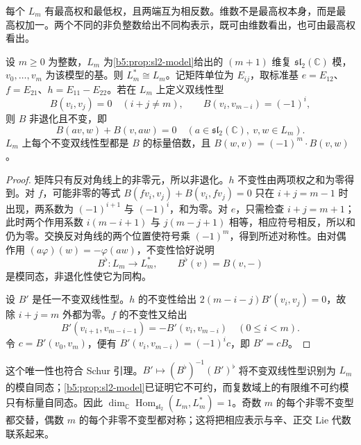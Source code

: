 每个 \(L_m\) 有最高权和最低权，且两端互为相反数。维数不是最高权本身，而是最高权加一。两个不同的非负整数给出不同构表示，既可由维数看出，也可由最高权看出。
\begin{proposition}\label{b5:prop:sl2-dual}
	设 \(m\ge0\) 为整数，\(L_m\) 为\cref{b5:prop:sl2-model}给出的 \((m+1)\) 维复 \(\mathfrak{sl}_2(\mathbb C)\) 模，\(v_0,\ldots,v_m\) 为该模型的基。则 \(L_m^*\cong L_m\)。记矩阵单位为 \(E_{ij}\)，取标准基 \(e=E_{12}\)、\(f=E_{21}\)、\(h=E_{11}-E_{22}\)。若在 \(L_m\) 上定义双线性型
	\[
		B(v_i,v_j)=0\quad(i+j\ne m),\qquad B(v_i,v_{m-i})=(-1)^i,
	\]
	则 \(B\) 非退化且不变，即
	\[
		B(av,w)+B(v,aw)=0 \quad(a\in\mathfrak{sl}_2(\mathbb C),\ v,w\in L_m).
	\]
	\(L_m\) 上每个不变双线性型都是 \(B\) 的标量倍数，且 \(B(w,v)=(-1)^m\cdot B(v,w)\)。
\end{proposition}
\begin{proof}
	矩阵只有反对角线上的非零元，所以非退化。\(h\) 不变性由两项权之和为零得到。对 \(f\)，可能非零的等式 \(B(fv_i,v_j)+B(v_i,fv_j)=0\) 只在 \(i+j=m-1\) 时出现，两系数为 \((-1)^{i+1}\) 与 \((-1)^i\)，和为零。对 \(e\)，只需检查 \(i+j=m+1\)；此时两个作用系数 \(i(m-i+1)\) 与 \(j(m-j+1)\) 相等，相应符号相反，所以和仍为零。交换反对角线的两个位置使符号乘 \((-1)^m\)，得到所述对称性。由对偶作用 \((a\varphi)(w)=-\varphi(aw)\)，不变性恰好说明
	\[
		B^\flat:L_m\longrightarrow L_m^*,\qquad B^\flat(v)=B(v,-)
	\]
	是模同态，非退化性使它为同构。

	设 \(B'\) 是任一不变双线性型。\(h\) 的不变性给出 \(2(m-i-j)B'(v_i,v_j)=0\)，故除 \(i+j=m\) 外都为零。\(f\) 的不变性又给出
	\[
		B'(v_{i+1},v_{m-i-1})=-B'(v_i,v_{m-i}) \quad(0\le i<m).
	\]
	令 \(c=B'(v_0,v_m)\)，便有 \(B'(v_i,v_{m-i})=(-1)^ic\)，即 \(B'=cB\)。
\end{proof}
这个唯一性也符合 Schur 引理。\(B'\mapsto(B^\flat)^{-1}(B')^\flat\) 将不变双线性型识别为 \(L_m\) 的模自同态；\cref{b5:prop:sl2-model}已证明它不可约，而复数域上的有限维不可约模只有标量自同态。因此 \(\dim_{\mathbb C}\operatorname{Hom}_{\mathfrak{sl}_2}(L_m,L_m^*)=1\)。奇数 \(m\) 的每个非零不变型都交替，偶数 \(m\) 的每个非零不变型都对称；这将把相应表示与辛、正交 Lie 代数联系起来。

